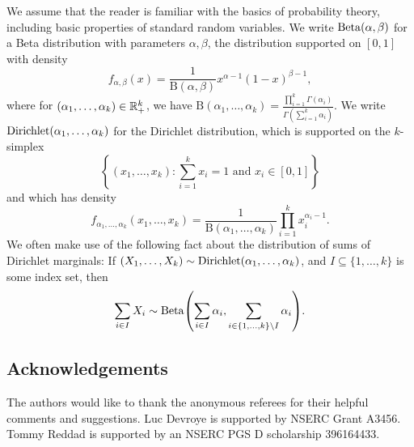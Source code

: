 We assume that the reader is familiar with the basics of probability
theory, including basic properties of standard random variables.  We
write $\operatorname{Beta}(\alpha, \beta)$ for a Beta distribution with parameters
$\alpha, \beta$, \ie the distribution supported on $[0, 1]$ with
density
\[
  f_{\alpha, \beta}(x) = \frac{1}{\mathrm{B}(\alpha, \beta)} x^{\alpha - 1} (1 - x)^{\beta - 1} ,
\]
where for $(\alpha_1, \dots, \alpha_k) \in \mathbb{R}^k_+$, we have
$\mathrm{B}(\alpha_1, \dots, \alpha_k) = \frac{\prod_{i = 1}^k
  \Gamma(\alpha_i)}{\Gamma(\sum_{i = 1}^k \alpha_i)}$. We write
$\operatorname{Dirichlet}(\alpha_1, \dots, \alpha_k)$ for the Dirichlet
distribution, which is supported on the $k$-simplex
\[
  \left\{(x_1, \dots, x_k) \colon \sum_{i = 1}^k x_i = 1 \text{ and } x_i \in [0, 1] \right\} 
\]
and which has density
\[
  f_{\alpha_1, \dots, \alpha_k}(x_1, \dots, x_k) = \frac{1}{\mathrm{B}(\alpha_1, \dots, \alpha_k)} \prod_{i = 1}^k x_i^{\alpha_i - 1} .
\]
We often make use of the following fact about the distribution of sums
of Dirichlet marginals: If
$(X_1, \dots, X_k) \sim \operatorname{Dirichlet}(\alpha_1, \dots, \alpha_k)$, and
$I \subseteq \{1, \dots, k\}$ is some index set, then
\[
  \sum_{i \in I} X_i \sim \Beta\left(\sum_{i \in I} \alpha_i, \sum_{i \in \{1, \dots, k\} \setminus I} \alpha_i\right) .
\]

\subsection{Acknowledgements}
The authors would like to thank the anonymous referees for their
helpful comments and suggestions. Luc Devroye is supported by NSERC
Grant A3456. Tommy Reddad is supported by an NSERC PGS D scholarship
396164433.
